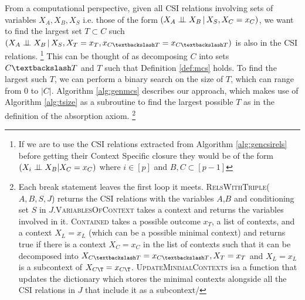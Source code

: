 \documentclass{tufte-book}
\begin{document}
\begin{Definition}
From a computational perspective, given all CSI relations involving sets of variables \(X_A,X_B,X_S\) i.e. those of the form \((X_A \perp \!\!\! \perp X_B \,|\, X_S, X_C=x_C)\), we want to find the largest set \(T \subset C\) such \((X_A \indep X_B \,|\, X_S, X_T=x_T, x_{C \textbackslash T} = x_{C \textbackslash T})\) is also in the CSI relations.  \footnote{If we are to use the CSI relations extracted from Algorithm \ref{alg:gencsirels} before getting their Context Specific closure they would be of the form $(X_i \perp \!\!\! \perp X_B | X_C=x_C)$ where $i \in [p]$ and $B ,C \subset [p-1]$}  This can be thought of as decomposing \(C\) into sets \(C \textbackslash T\) and \(T\) such that Definition \ref{def:mcs} holds. To find the largest such \(T\), we can perform a binary search on the size of \(T\), which can range from \(0\) to \(|C|\). Algorithm \ref{alg:genmcs} describes our approach, which makes use of Algorithm \ref{alg:tsize} as a subroutine to find the largest possible \(T\) as in the definition of the absorption axiom.  \footnote{Each break statement leaves the first loop it meets. \textsc{RelsWithTriple}($A,B,S,J$) returns the CSI relations with the variables $A$,$B$ and conditioning set $S$ in $J$.\textsc{VariablesOfContext} takes a context and returns the variables involved in it. \textsc{Contained} takes a possible outcome $x_T$, a list of contexts, and a context $X_L=x_L$ (which can be a possible minimal context) and returns true if there is a context $X_C=x_C$ in the list of contexts such that it can be decomposed into $X_{C\textbackslash T}=x_{C\textbackslash T}, X_T=x_T$ and $X_L=x_L$ is a subcontext of $X_{C\T}=x_{C\T}$. \textsc{UpdateMinimalContexts} isa a function that updates the dictionary which stores the minimal contexts alongside all the CSI relations in $J$ that include it as a subcontext/} 







\end{Definition}
\end{document}
